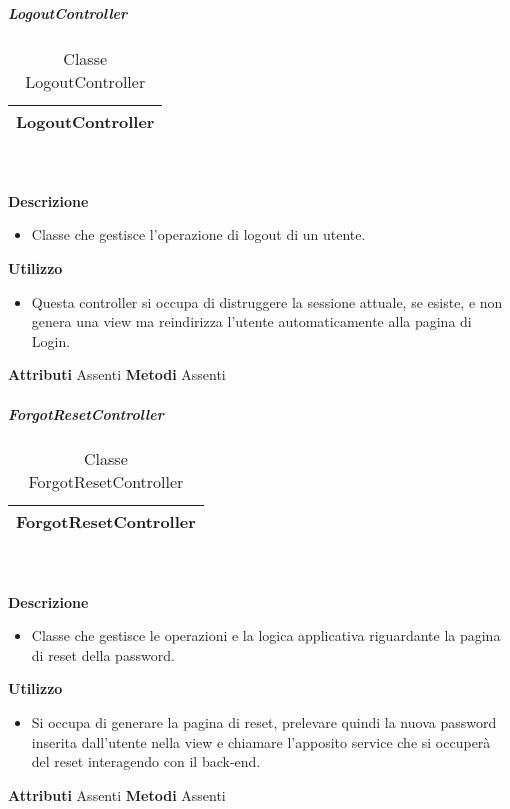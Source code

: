 			\subparagraph{LogoutController} 
\begin{table}[ht]
\begin{center}
\bgroup
	\setlength{\arrayrulewidth}{0.6mm}
	\def\arraystretch{1}
		\begin{tabular}{ | p{12cm} | }
				\hline  
					\centerline{\textbf{LogoutController}}
		\\ \hline 
				\hline
				\hline
		
		\end{tabular}
\egroup
\caption{Classe LogoutController}
\end{center}
\end{table} \textbf{\\ \\ Descrizione}
\begin{itemize}
\item[] Classe che gestisce l'operazione di logout di un utente.
\end{itemize} 
\textbf{Utilizzo}
\begin{itemize}
\item[] Questa controller si occupa di distruggere la sessione attuale, se esiste, e non genera una view ma reindirizza l'utente automaticamente alla pagina di Login.
\end{itemize}
\textbf{Attributi}
Assenti
\textbf{Metodi}
Assenti

			\subparagraph{ForgotResetController} 
\begin{table}[ht]
\begin{center}
\bgroup
	\setlength{\arrayrulewidth}{0.6mm}
	\def\arraystretch{1}
		\begin{tabular}{ | p{12cm} | }
				\hline  
					\centerline{\textbf{ForgotResetController}}
		\\ \hline 
				\hline
				\hline
		
		\end{tabular}
\egroup
\caption{Classe ForgotResetController}
\end{center}
\end{table} \textbf{\\ \\ Descrizione}
\begin{itemize}
\item[] Classe che gestisce le operazioni e la logica applicativa riguardante la pagina di reset della password.
\end{itemize} 
\textbf{Utilizzo}
\begin{itemize}
\item[] Si occupa di generare la pagina di reset, prelevare quindi la nuova password inserita dall'utente nella view e chiamare l'apposito service che si occuperà del reset interagendo con il back-end.
\end{itemize}
\textbf{Attributi}
Assenti
\textbf{Metodi}
Assenti

